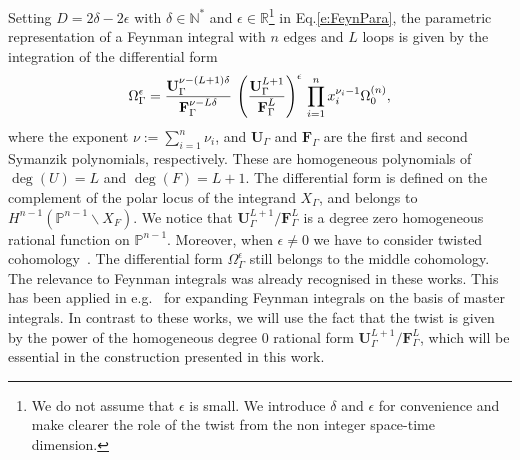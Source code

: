 \documentclass[a4paper,12pt]{article}
\numberwithin{equation}{section}
\numberwithin{figure}{section}
\begin{document}
Setting  $D=2\delta-2\epsilon$ with $\delta\in\mathbb N^*$ and
$\epsilon\in\mathbb R$\footnote{We do not assume that $\epsilon$ is
	small. We introduce $\delta$ and $\epsilon$ for convenience and make
	clearer the role of the twist from the non integer space-time dimension.} in Eq.\eqref{e:FeynPara}, 
the parametric representation of a Feynman integral
with $n$ edges and
 $L$ loops is given by the integration of the differential
form  
\begin{equation}
  \Omega^\epsilon_\Gamma={\textbf{U}_\Gamma^{\nu-(L+1)\delta} \over \textbf{F}_\Gamma^{\nu-L\delta}}\,
  \left(\textbf{U}_\Gamma^{L+1}\over \textbf{F}_\Gamma^L\right)^{\epsilon} \, \prod_{i=1}^n x_i^{\nu_i-1} \Omega^{(n)}_0 , 
\end{equation}
%
where the exponent $\nu:=\sum_{i=1}^n \nu_i$, and $\textbf{U}_\Gamma$ and $\textbf{F}_\Gamma$ are the first and second Symanzik
polynomials, 
respectively. These are homogeneous  polynomials of
$\deg(U)=L$ and $\deg(F)=L+1$. 
%
%
The differential form is defined on the complement of the polar locus
of the integrand $X_\Gamma$, and belongs to $H^{n-1}( \mathbb
P^{n-1}\backslash X_F)$. We notice that   $\textbf{U}_\Gamma^{L+1}/\textbf{F}_\Gamma^L$ is a degree
zero homogeneous rational function on $\mathbb
P^{n-1}$. Moreover,  when $\epsilon\neq0$ we have to consider twisted
cohomology~\cite{Aomoto1,Aomoto,Aomoto_1982,AomotoBook}. The differential form
$\Omega_\Gamma^\epsilon$ still belongs to the middle cohomology. The
relevance to Feynman integrals was already recognised in these works. 
This has been applied in
e.g.~\cite{Mizera:2017rqa,Frellesvig:2019uqt,Cacciatori:2021nli}  for
expanding Feynman integrals on the basis of master integrals. In contrast to these works, 
we will use
the fact that the twist is given by
the power of the homogeneous degree 0 rational form
$\textbf{U}_\Gamma^{L+1}/\textbf{F}_\Gamma^L$, which will be essential
in the construction presented in this work.
\end{document}

